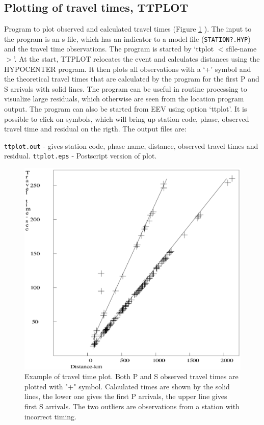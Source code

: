 
\subsection{Plotting of travel times, TTPLOT} 
\label{subs:ttplot}

Program to plot observed and calculated travel times (Figure 
\ref{fig:travel-time-plot}
). The input to the program is an s-file, which has an indicator to a model file (\texttt{STATION?.HYP}) and the travel time observations. The program is started by `ttplot $<$sfile-name$>$'. At the start, TTPLOT relocates the event and calculates distances using the HYPOCENTER program. It then plots all observations with a `+' symbol and the theoretical travel times that are calculated by the program for the first P and S arrivals with solid lines. The program can be useful in routine processing to visualize large residuals, which otherwise are seen from the location program output. The program can also be started from EEV using option `ttplot'. It is possible to click on symbols, which will bring up station code, phase, observed travel time and residual on the rigth. The output files are: 

\texttt{ttplot.out} - gives station code, phase name, distance, observed travel times and residual. 
\newline
\texttt{ttplot.eps} -  Postscript version of plot.  

\begin{figure}
\centerline{\includegraphics[width=0.9\linewidth]{fig/travel-time-plot}}
\caption{Example of travel time plot. Both P and S observed travel times are plotted with "+"
symbol. Calculated times are shown by the solid lines, the lower one gives the first P arrivals,
the upper line gives first S arrivals. The two outliers are observations from a station with
incorrect timing.
}
\label{fig:travel-time-plot}
\end{figure}



